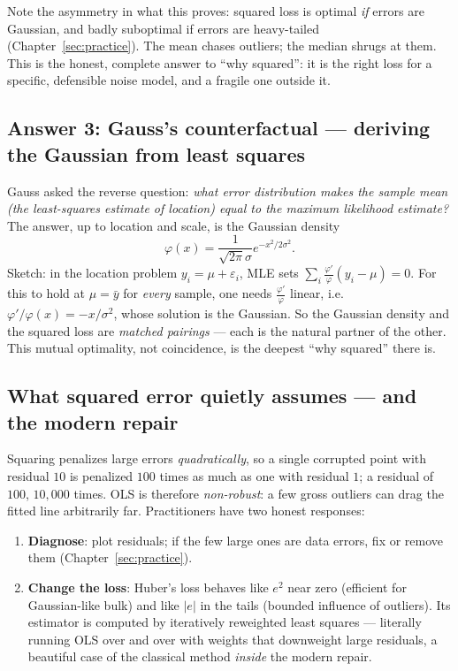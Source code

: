 Note the asymmetry in what this proves: squared loss is optimal \emph{if} errors are Gaussian, and badly suboptimal if errors are heavy-tailed (Chapter~\ref{sec:practice}). The mean chases outliers; the median shrugs at them. This is the honest, complete answer to ``why squared'': it is the right loss for a specific, defensible noise model, and a fragile one outside it.

\subsection{Answer 3: Gauss's counterfactual — deriving the Gaussian from least squares}

Gauss asked the reverse question: \emph{what error distribution makes the sample mean (the least-squares estimate of location) equal to the maximum likelihood estimate?} The answer, up to location and scale, is the Gaussian density
\[
  \varphi(x) = \frac{1}{\sqrt{2\pi}\sigma} e^{-x^2 / 2\sigma^2}.
\]
Sketch: in the location problem $y_i = \mu + \varepsilon_i$, MLE sets $\sum_i \frac{\varphi'}{\varphi}(y_i - \mu) = 0$. For this to hold at $\mu = \bar{y}$ for \emph{every} sample, one needs $\frac{\varphi'}{\varphi}$ linear, i.e.\ $\varphi'/\varphi(x) = -x/\sigma^2$, whose solution is the Gaussian. So the Gaussian density and the squared loss are \emph{matched pairings} — each is the natural partner of the other. This mutual optimality, not coincidence, is the deepest ``why squared'' there is.

\subsection{What squared error quietly assumes — and the modern repair}

Squaring penalizes large errors \emph{quadratically}, so a single corrupted point with residual $10$ is penalized $100$ times as much as one with residual $1$; a residual of $100$, $10{,}000$ times. OLS is therefore \emph{non-robust}: a few gross outliers can drag the fitted line arbitrarily far. Practitioners have two honest responses:

\begin{enumerate}[label=(\roman*)]
  \item \textbf{Diagnose}: plot residuals; if the few large ones are data errors, fix or remove them (Chapter~\ref{sec:practice}).
  \item \textbf{Change the loss}: Huber's loss behaves like $e^2$ near zero (efficient for Gaussian-like bulk) and like $|e|$ in the tails (bounded influence of outliers). Its estimator is computed by iteratively reweighted least squares — literally running OLS over and over with weights that downweight large residuals, a beautiful case of the classical method \emph{inside} the modern repair.
\end{enumerate}

